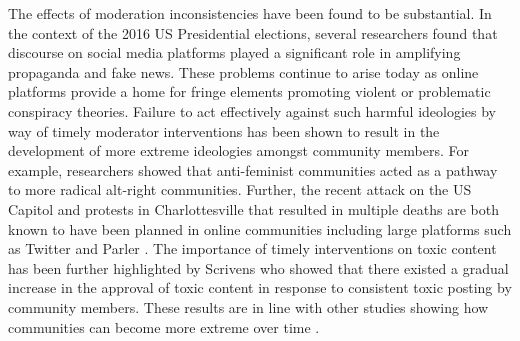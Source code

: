 The effects of moderation inconsistencies have been found to be
substantial. In the context of the 2016 US Presidential elections, several
researchers \cite{benkler2018network, allcott2017social} found that discourse
on social media platforms played a significant role in amplifying propaganda
and fake news. These problems continue to arise today as online platforms
provide a home for fringe elements promoting violent or problematic conspiracy
theories. Failure to act effectively against such harmful ideologies by way of
timely moderator interventions has been shown to result in the development of
more extreme ideologies amongst community members. For example, researchers
\cite{mamie2021anti} showed that anti-feminist communities acted as a pathway
to more radical alt-right communities. Further, the recent attack on the US
Capitol and protests in Charlottesville that resulted in multiple deaths are
both known to have been planned in online communities including large platforms
such as Twitter and Parler \cite{prabhu2021capitol}. The importance of timely
interventions on toxic content has been further highlighted by Scrivens \etal
\cite{scrivens2020examining} who showed that there existed a gradual increase
in the approval of toxic content in response to consistent toxic posting by
community members. These results are in line with other studies showing how
communities can become more extreme over time \cite{simi2015american,
wojcieszak2010don, caiani2015transnationalization, wright2020pussy,
ribeiro2020evolution}.

% 
% 


